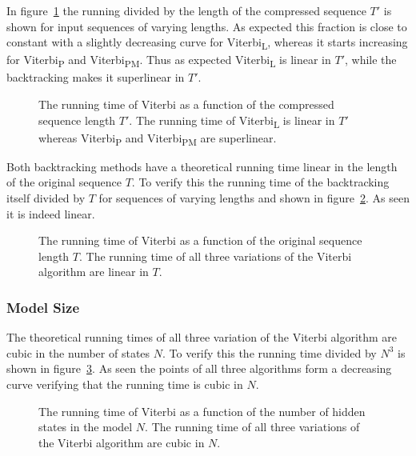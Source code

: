 In figure~\ref{fig:assymptotic_viterbi_T} the running divided by the length of
the compressed sequence $T'$ is shown for input sequences of varying
lengths. As expected this fraction is close to constant with a slightly
decreasing curve for Viterbi\textsubscript{L}, whereas it starts increasing for Viterbi\textsubscript{P} and
Viterbi\textsubscript{PM}. Thus as expected Viterbi\textsubscript{L} is linear in $T'$, while
the backtracking makes it superlinear in $T'$.

\begin{figure}
  \centering
  
  \caption{The running time of Viterbi as a function of the compressed sequence
    length $T'$. The running time of Viterbi\textsubscript{L} is linear in
    $T'$ whereas Viterbi\textsubscript{P} and Viterbi\textsubscript{PM} are
    superlinear.}
  \label{fig:assymptotic_viterbi_T}
\end{figure}

Both backtracking methods have a theoretical running time linear in the length
of the original sequence $T$. To verify this the running time of the
backtracking itself divided by $T$ for sequences of varying lengths and shown in
figure~\ref{fig:assymptotic_viterbi_backtrack_T}. As seen it is indeed linear.

\begin{figure}
  \centering
  
  \caption{The running time of Viterbi as a function of the original sequence
    length $T$. The running time of all three variations of the Viterbi
    algorithm are linear in $T$.}
  \label{fig:assymptotic_viterbi_backtrack_T}
\end{figure}

\subsubsection{Model Size}

The theoretical running times of all three variation of the Viterbi algorithm
are cubic in the number of states $N$. To verify this the running time divided
by $N^3$ is shown in figure~\ref{fig:assymptotic_viterbi_backtrack_N}. As seen
the points of all three algorithms form a decreasing curve verifying that the
running time is cubic in $N$.

\begin{figure}
  \centering
  
  \caption{The running time of Viterbi as a function of the number of hidden
    states in the model $N$. The running time of all three variations of the Viterbi
    algorithm are cubic in $N$.}
  \label{fig:assymptotic_viterbi_backtrack_N}
\end{figure}

